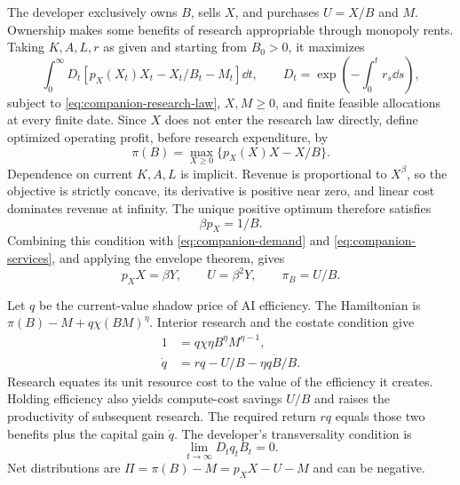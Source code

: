 The developer exclusively owns $B$, sells $X$, and purchases $U=X/B$ and $M$.
Ownership makes some benefits of research appropriable through monopoly rents.
Taking $K,A,L,r$ as given and starting from $B_0>0$, it maximizes
\begin{equation}
 \int_0^\infty D_t[p_X(X_t)X_t-X_t/B_t-M_t]\dd t,
 \qquad D_t=\exp\!\left(-\int_0^t r_s\dd s\right),
 \label{eq:companion-developer-objective}
\end{equation}
subject to \eqref{eq:companion-research-law}, $X,M\geq0$, and finite feasible
allocations at every finite date. Since $X$ does not enter the research law
directly, define optimized operating profit, before research expenditure, by
\begin{equation}
 \pi(B)=\max_{X\geq0}\{p_X(X)X-X/B\}.
 \label{eq:companion-static-monopoly}
\end{equation}
Dependence on current $K,A,L$ is implicit. Revenue is proportional to $X^\beta$,
so the objective is strictly concave, its derivative is positive near zero,
and linear cost dominates revenue at infinity. The unique positive optimum
therefore satisfies
\begin{equation}
 \beta p_X=1/B.
 \label{eq:companion-monopoly-foc}
\end{equation}
Combining this condition with \eqref{eq:companion-demand} and
\eqref{eq:companion-services}, and applying the envelope theorem, gives
\begin{equation}
 p_XX=\beta Y,\qquad U=\beta^2Y,\qquad\pi_B=U/B.
 \label{eq:companion-static-shares}
\end{equation}

Let $q$ be the current-value shadow price of AI efficiency. The Hamiltonian
is $\pi(B)-M+q\chi(BM)^\eta$. Interior research and the costate condition give
\begin{align}
 1&=q\chi\eta B^\eta M^{\eta-1},\label{eq:companion-research-foc}\\
 \dot q&=rq-U/B-\eta q\dot B/B.\label{eq:companion-costate}
\end{align}
Research equates its unit resource cost to the value of the efficiency it
creates. Holding efficiency also yields compute-cost savings $U/B$ and
raises the productivity of subsequent research. The required return $rq$
equals those two benefits plus the capital gain $\dot q$. The developer's
transversality condition is
\begin{equation}
 \lim_{t\to\infty}D_tq_tB_t=0.
 \label{eq:companion-developer-tvc}
\end{equation}
Net distributions are $\Pi=\pi(B)-M=p_XX-U-M$ and can be negative.


